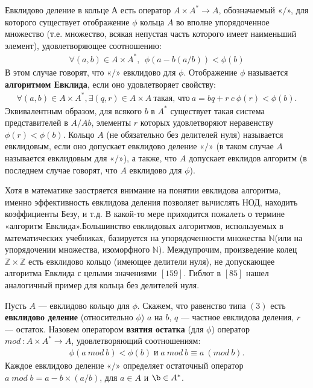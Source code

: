 \documentclass{../../template/mai_book}
\begin{document}
\begin{determ}
Евклидово деление в кольце $А$ есть оператор $A\times A^* \rightarrow A$, обозначаемый «$/$», для которого существует отображение $\phi$ кольца $A$ во вполне упорядоченное множество (т.е. множество, всякая непустая часть которого имеет наименьший элемент), удовлетворяющее соотношению:
\begin{align}
\forall(a,b) \in A \times A^*, \:\: \phi(a - b(a/b)) < \phi(b)
\end{align}
В этом случае говорят, что «$/$» евклидово для $\phi$. Отображение $\phi$ называется \textbf{алгоритмом Евклида}, если оно удовлетворяет свойству:
\begin{align}
\forall(a,b) \in A \times A^*, \exists(q,r) \in A \times A \:\text{такая, что}\: a = bq + r \: c \:\phi(r) < \phi(b)\text{.}
\end{align}
Эквивалентным образом, для всякого $b$ в $A^*$ существует такая система представителей в $A/Ab$, элементы $r$ которых удовлетворяют неравенству $\phi(r)<\phi(b)$.
\newpage
\indent Кольцо $A$ (не обязательно без делителей нуля) называется евклидовым, если оно допускает евклидово деление «$/$» (в таком случае $A$ называется евклидовым для «$/$»), а также, что $A$ допускает евклидов алгоритм (в последнем случае говорят, что $A$ евклидово для $\phi$).
\end{determ}

\begin{mynotice}
Хотя в математике заостряется внимание на понятии евклидова алгоритма, именно эффективность евклидова деления позволяет вычислять НОД, находить коэффициенты Безу, и т.д. В какой-то мере приходится пожалеть о термине «алгоритм Евклида».\newline \indent Большинство евклидовых алгоритмов, используемых в математических учебниках, базируется на упорядоченности множества $\mathds{N}$(или на упорядочении множества, изоморфного $\mathds{N}$). Междупрочим, произведение колец $\mathds{Z} \times \mathds{Z}$ есть евклидово кольцо (имеющее делители нуля), не допускающее алгоритма Евклида с целыми значениями $[159]$. Гиблот в $[85]$ нашел аналогичный пример для кольца без делителей нуля.
\end{mynotice}

\begin{determ}
\textit{\indent} Пусть $A$ — евклидово кольцо для $\phi$. Скажем, что равенство типа $(3)$ есть \textbf{евклидово деление} (относительно $\phi$) $a$ на $b$, $q$ — частное евклидова деления, $r$ — остаток. Назовем оператором \textbf{взятия остатка} (для $\phi$) оператор $mod\::A \times A^* \rightarrow A$, удовлетворяющий соотношениям:
\begin{align*}
\phi(a\:mod\:b) < \phi(b)\;\text{и}\; a\:mod\:b\equiv a\:(mod\:b)\text{.}
\end{align*}
Каждое евклидово деление «$/$» определяет остаточный оператор\newline$a\;mod\;b = a - b \times (a/b)$, для $a \in A$ и $\b \in A^*$.
\end{determ}
\end{document}
